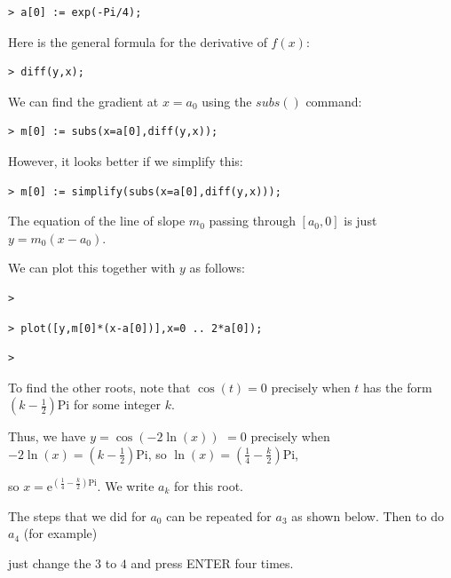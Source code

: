 \documentclass{article}
\begin{document}
\begin{lstlisting}
> a[0] := exp(-Pi/4);
\end{lstlisting}
\begin{Maple Normal}
Here is the general formula for the derivative of 
$f (x)$:
\end{Maple Normal}
\begin{lstlisting}
> diff(y,x);
\end{lstlisting}
\begin{Maple Normal}
We can find the gradient at 
$x =a_{0}$ using the 
$\mathit{subs} ()$ command:
\end{Maple Normal}
\begin{lstlisting}
> m[0] := subs(x=a[0],diff(y,x));
\end{lstlisting}
\begin{Maple Normal}
However, it looks better if we simplify this: 
\end{Maple Normal}
\begin{lstlisting}
> m[0] := simplify(subs(x=a[0],diff(y,x)));
\end{lstlisting}
\begin{Maple Normal}
The equation of the line of slope 
$m_{0}$ passing through 
$[a_{0},0]$ is just 
$y =m_{0} (x -a_{0})$.  \

We can plot this together with 
$y $ as follows:
\end{Maple Normal}
\begin{lstlisting}
> 
\end{lstlisting}
\begin{lstlisting}
> plot([y,m[0]*(x-a[0])],x=0 .. 2*a[0]);
\end{lstlisting}
\begin{lstlisting}
> 
\end{lstlisting}
\begin{Maple Normal}
To find the other roots, note that 
$\cos (t)=0$ precisely when 
$t $ has the form 
$(k -\frac{1}{2}) \mathrm{Pi}$ for some integer 
$k $.\

Thus, we have 
$y =\cos (-2 \ln (x))$ 
$=0$ precisely when 
$-2 \ln (x)=(k -\frac{1}{2}) \mathrm{Pi}$,  so 
$\ln (x)=(\frac{1}{4}-\frac{k}{2}) \mathrm{Pi}$,\

so 
$x ={\mathrm e}^{(\frac{1}{4}-\frac{k}{2}) \mathrm{Pi}}$.  We write 
$a_{k}$ for this root.  
\end{Maple Normal}
\begin{Maple Normal}
The steps that we did for 
$a_{0}$ can be repeated for 
$a_{3}$ as shown below.  Then to do 
$a_{4}$ (for example) \

just change the 
$3$ to  
$4$ and press ENTER four times. 
\end{Maple Normal}
\end{document}
